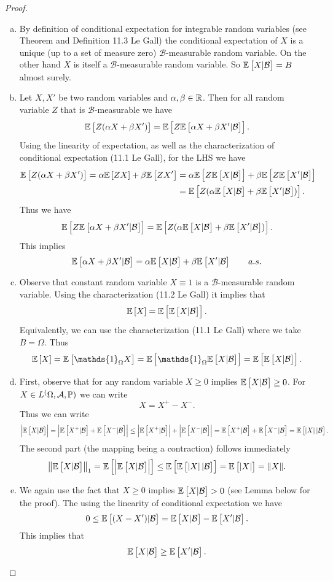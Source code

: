 \begin{proof}
	\begin{enumerate}[(a)]
		\item By definition of conditional expectation for integrable random variables (see Theorem and Definition 11.3 Le Gall) the conditional expectation of $ X $ is a unique (up to a set of measure zero) $ \mathcal{B} $-measurable random variable. On the other hand $ X $ is itself a $ \mathcal{B} $-measurable random variable. So $ \mathbb{E}\left[X|\mathcal{B}\right] = B $ almost surely.
		\item Let $ X,X' $ be two random variables and $ \alpha,\beta \in \mathbb{R} $. Then for all random variable $ Z $ that is $ \mathcal{B} $-measurable we have
		\[ \mathbb{E}\left[Z(\alpha X + \beta X')\right] = \mathbb{E}\left[Z\mathbb{E}\left[\alpha X + \beta X'|\mathcal{B}\right]\right]. \]
		Using the linearity of expectation, as well as the characterization of conditional expectation (11.1 Le Gall), for the LHS we have
		\begin{align*}
			\mathbb{E}\left[Z(\alpha X + \beta X')\right] = \alpha\mathbb{E}\left[ZX\right] + \beta\mathbb{E}\left[ZX'\right] &= \alpha\mathbb{E}\left[Z\mathbb{E}\left[X|\mathcal{B}\right]\right] + \beta\mathbb{E}\left[Z\mathbb{E}\left[X'|\mathcal{B}\right]\right] \\
			&= \mathbb{E}\left[Z(\alpha\mathbb{E}\left[X|\mathcal{B}\right]+\beta\mathbb{E}\left[X'|\mathcal{B}\right])\right].
		\end{align*}
		Thus we have
		\[ \mathbb{E}\left[Z\mathbb{E}\left[\alpha X + \beta X'|\mathcal{B}\right]\right] = \mathbb{E}\left[Z(\alpha\mathbb{E}\left[X|\mathcal{B}\right]+\beta\mathbb{E}\left[X'|\mathcal{B}\right])\right]. \]
		This implies
		\[ \mathbb{E}\left[\alpha X + \beta X'|\mathcal{B}\right] = \alpha\mathbb{E}\left[X|\mathcal{B}\right] + \beta\mathbb{E}\left[X'|\mathcal{B}\right] \qquad a.s. \]
		
		\item Observe that constant random variable $ X\equiv 1 $ is a $ \mathcal{B} $-measurable random variable. Using the characterization (11.2 Le Gall) it implies that  
		\[ \mathbb{E}\left[X\right] = \mathbb{E}\left[\mathbb{E}\left[X|\mathcal{B}\right]\right]. \]
		Equivalently, we can use the characterization (11.1 Le Gall) where we take $ B = \Omega $. Thus
		\[ \E{X} = \E{\mathds{1}_\Omega X} = \E{\mathds{1}_\Omega\E{X|\mathcal{B}}} = \E{\E{X|\mathcal{B}}}. \]
		
		\item First, observe that for any random variable $ X\geq 0 $ implies $ \mathbb{E}\left[X|\mathcal{B}\right] \geq 0 $. For $ X\in L^(\Omega,\mathcal{A},\mathbb{P}) $ we can write
		\[ X = X^+ - X^-. \]
		Thus we can write
		\[ \left|\mathbb{E}\left[X|\mathcal{B}\right]\right| = \left|\mathbb{E}\left[X^+|\mathcal{B}\right] + \mathbb{E}\left[X^-|\mathcal{B}\right]\right| \leq \left|\mathbb{E}\left[X^+|\mathcal{B}\right]\right| + \left|\mathbb{E}\left[X^-|\mathcal{B}\right]\right| = \mathbb{E}\left[X^+|\mathcal{B}\right] + \mathbb{E}\left[X^-|\mathcal{B}\right] = \mathbb{E}\left[\left|X\right||\mathcal{B}\right]. \]
		The second part (the mapping being a contraction) follows immediately
		\[  \norm{\mathbb{E}\left[X|\mathcal{B}\right]}_1 = \mathbb{E}\left[\left|\mathbb{E}\left[X|\mathcal{B}\right]\right|\right] \leq \mathbb{E}\left[\mathbb{E}\left[\left|X\right||\mathcal{B}\right]\right] = \mathbb{E}\left[\left|X\right|\right] = \norm{X}.  \]
		
		\item We again use the fact that $ X\geq 0 $ implies $ \mathbb{E}\left[X|\mathcal{B}\right]>0 $ (see Lemma below for the proof). The using the linearity of conditional expectation we have
		\[ 0 \leq \mathbb{E}\left[(X-X')|\mathcal{B}\right] = \mathbb{E}\left[X|\mathcal{B}\right] - \mathbb{E}\left[X'|\mathcal{B}\right]. \]
		This implies that
		\[ \mathbb{E}\left[X|\mathcal{B}\right]\geq \mathbb{E}\left[X'|\mathcal{B}\right]. \]
	\end{enumerate}
\end{proof}

